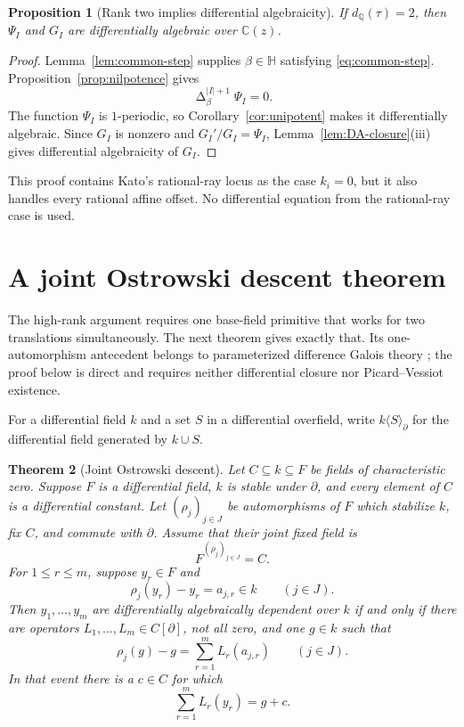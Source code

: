 \documentclass[11pt]{article}
\numberwithin{equation}{section}
\newtheorem{theorem}{Theorem}[section]
\newtheorem{proposition}[theorem]{Proposition}
\theoremstyle{definition}
\theoremstyle{remark}
\newcommand{\C}{\mathbb C}
\newcommand{\Q}{\mathbb Q}
\newcommand{\HH}{\mathbb H}
\newcommand{\Deltaop}{\mathop{\Delta}}
\begin{document}
\begin{proposition}[Rank two implies differential algebraicity]
\label{prop:low-phase}
If $d_\Q(\tau)=2$, then $\Psi_I$ and $G_I$ are differentially algebraic
over $\C(z)$.
\end{proposition}

\begin{proof}
Lemma~\ref{lem:common-step} supplies $\beta\in\HH$ satisfying
\eqref{eq:common-step}.  Proposition~\ref{prop:nilpotence} gives
\[
 \Deltaop_\beta^{|I|+1}\Psi_I=0.
\]
The function $\Psi_I$ is $1$-periodic, so Corollary~\ref{cor:unipotent}
makes it differentially algebraic.  Since $G_I$ is nonzero and
$G_I'/G_I=\Psi_I$, Lemma~\ref{lem:DA-closure}(iii) gives differential
algebraicity of $G_I$.
\end{proof}

This proof contains Kato's rational-ray locus as the case $k_i=0$, but it
also handles every rational affine offset.  No differential equation from
the rational-ray case is used.

\section{A joint Ostrowski descent theorem}
\label{sec:ostrowski}

The high-rank argument requires one base-field primitive that works for two
translations simultaneously.  The next theorem gives exactly that.  Its
one-automorphism antecedent belongs to parameterized difference Galois
theory \cite[Proposition~3.1]{HardouinSinger2008}; the proof below is direct
and requires neither differential closure nor Picard--Vessiot existence.

For a differential field $k$ and a set $S$ in a differential overfield,
write $k\langle S\rangle_\partial$ for the differential field generated by
$k\cup S$.

\begin{theorem}[Joint Ostrowski descent]
\label{thm:ostrowski}
Let $C\subseteq k\subseteq F$ be fields of characteristic zero.  Suppose
$F$ is a differential field, $k$ is stable under $\partial$, and every
element of $C$ is a differential constant.  Let $(\rho_j)_{j\in J}$ be
automorphisms of $F$ which stabilize $k$, fix $C$, and commute with
$\partial$.  Assume that their joint fixed field is
\[
 F^{(\rho_j)_{j\in J}}=C.
\]
For $1\leq r\leq m$, suppose $y_r\in F$ and
\[
 \rho_j(y_r)-y_r=a_{j,r}\in k
 \qquad(j\in J).
\]
Then $y_1,\ldots,y_m$ are differentially algebraically dependent over $k$
if and only if there are operators $L_1,\ldots,L_m\in C[\partial]$, not all
zero, and one $g\in k$ such that
\begin{equation}
 \rho_j(g)-g=\sum_{r=1}^mL_r(a_{j,r})
 \qquad(j\in J).
 \label{eq:joint-coboundary}
\end{equation}
In that event there is a $c\in C$ for which
\begin{equation}
 \sum_{r=1}^mL_r(y_r)=g+c.
 \label{eq:joint-linear}
\end{equation}
\end{theorem}
\end{document}
